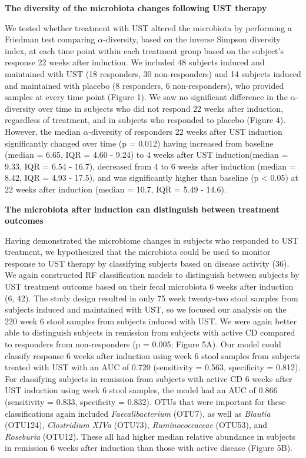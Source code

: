 \documentclass[12pt,]{article}
\begin{document}
\textbf{The diversity of the microbiota changes following UST therapy}

We tested whether treatment with UST altered the microbiota by
performing a Friedman test comparing \({\alpha}\)-diversity, based on
the inverse Simpson diversity index, at each time point within each
treatment group based on the subject's response 22 weeks after
induction. We included 48 subjects induced and maintained with UST (18
responders, 30 non-responders) and 14 subjects induced and maintained
with placebo (8 responders, 6 non-responders), who provided samples at
every time point (Figure 1). We saw no significant difference in the
\({\alpha}\)-diversity over time in subjects who did not respond 22
weeks after induction, regardless of treatment, and in subjects who
responded to placebo (Figure 4). However, the median
\({\alpha}\)-diversity of responders 22 weeks after UST induction
significantly changed over time (p = 0.012) having increased from
baseline (median = 6.65, IQR = 4.60 - 9.24) to 4 weeks after UST
induction(median = 9.33, IQR = 6.54 - 16.7), decreased from 4 to 6 weeks
after induction (median = 8.42, IQR = 4.93 - 17.5), and was
significantly higher than baseline (p \textless{} 0.05) at 22 weeks
after induction (median = 10.7, IQR = 5.49 - 14.6).

\textbf{The microbiota after induction can distinguish between treatment
outcomes}

Having demonstrated the microbiome changes in subjects who responded to
UST treatment, we hypothesized that the microbiota could be used to
monitor response to UST therapy by classifying subjects based on disease
activity (36). We again constructed RF classification models to
distinguish between subjects by UST treatment outcome based on their
fecal microbiota 6 weeks after induction (6, 42). The study design
resulted in only 75 week twenty-two stool samples from subjects induced
and maintained with UST, so we focused our analysis on the 220 week 6
stool samples from subjects induced with UST. We were again better able
to distinguish subjects in remission from subjects with active CD
compared to responders from non-responders (p = 0.005; Figure 5A). Our
model could classify response 6 weeks after induction using week 6 stool
samples from subjects treated with UST with an AUC of 0.720 (sensitivity
= 0.563, specificity = 0.812). For classifying subjects in remission
from subjects with active CD 6 weeks after UST induction using week 6
stool samples, the model had an AUC of 0.866 (sensitivity = 0.833,
specificity = 0.832). OTUs that were important for these classifications
again included \emph{Faecalibacterium} (OTU7), as well as \emph{Blautia}
(OTU124), \emph{Clostridium XIVa} (OTU73), \emph{Ruminococcaceae}
(OTU53), and \emph{Roseburia} (OTU12). These all had higher median
relative abundance in subjects in remission 6 weeks after induction than
those with active disease (Figure 5B).
\end{document}
